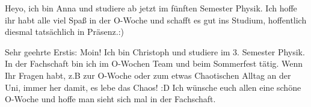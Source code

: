 \begin{multicols}{2}
{
Heyo, ich bin Anna und studiere ab jetzt im fünften Semester Physik. 
Ich hoffe ihr habt alle viel Spaß in der O-Woche und schafft es gut ins Studium, hoffentlich diesmal tatsächlich in Präsenz.:)
}

\vspace{-1cm}

{
Sehr geehrte Erstis: Moin!
Ich bin Christoph und studiere im 3. Semester Physik. In der Fachschaft bin ich im O-Wochen Team und beim Sommerfest tätig. Wenn Ihr Fragen habt, z.B zur O-Woche oder zum etwas Chaotischen Alltag an der Uni, immer her damit, es lebe das Chaos! :D 
Ich wünsche euch allen eine schöne O-Woche und hoffe man sieht sich mal in der Fachschaft.
}


\end{multicols}
